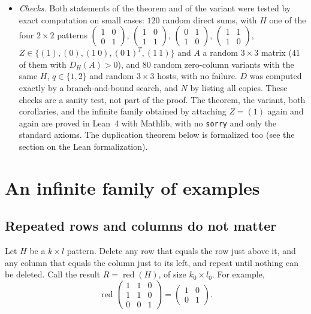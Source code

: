 \documentclass{article}
\theoremstyle{plain}
\theoremstyle{definition}
\begin{document}
\begin{itemize}
\item \sloppy\emph{Checks.} Both statements of the theorem and of the variant were tested by exact
computation on small cases: $120$ random direct sums, with $H$ one of the four $2 \times 2$
patterns $\left(\begin{smallmatrix}1&0\\0&1\end{smallmatrix}\right)$,
$\left(\begin{smallmatrix}1&0\\1&1\end{smallmatrix}\right)$,
$\left(\begin{smallmatrix}0&1\\1&0\end{smallmatrix}\right)$,
$\left(\begin{smallmatrix}1&1\\1&0\end{smallmatrix}\right)$,
$Z \in \{(1), (0), (1\ 0), (0\ 1)^{T}, (1\ 1)\}$ and $A$ a random $3 \times 3$ matrix ($41$ of
them with $D_H(A) > 0$), and $80$ random zero-column variants with the same $H$, $q \in \{1, 2\}$
and random $3 \times 3$ hosts, with no failure. $D$ was computed exactly by a branch-and-bound
search, and $N$ by listing all copies. These checks are a sanity test, not part of the
proof. The theorem, the variant, both corollaries, and the infinite family obtained by
attaching $Z = (1)$ again and again are proved in Lean~4 with Mathlib, with no \texttt{sorry}
and only the standard axioms. The duplication theorem below is formalized too (see the section
on the Lean formalization).
\end{itemize}

\section*{An infinite family of examples}
\subsection*{Repeated rows and columns do not matter}

Let $H$ be a $k\times l$ pattern. Delete any row that equals the row just above it, and any column that
equals the column just to its left, and repeat until nothing can be deleted. Call the result
$R=\operatorname{red}(H)$, of size $k_0\times l_0$. For example,
\[
 \operatorname{red}\begin{pmatrix}1&1&0\\1&1&0\\0&0&1\end{pmatrix}=\begin{pmatrix}1&0\\0&1\end{pmatrix}.
\]
\end{document}

